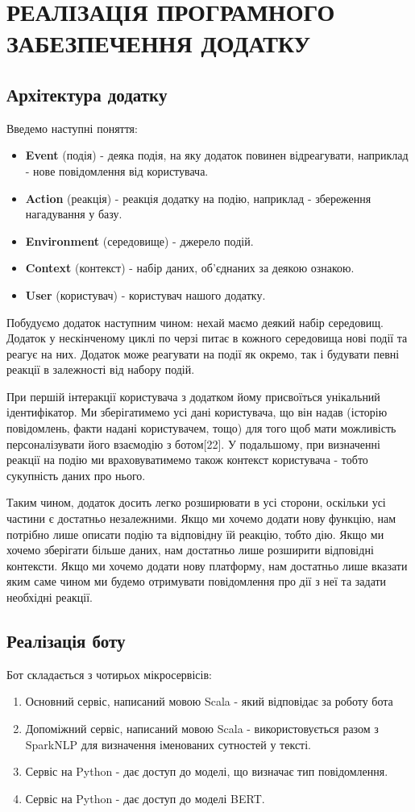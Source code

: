 \chapter{РЕАЛІЗАЦІЯ ПРОГРАМНОГО ЗАБЕЗПЕЧЕННЯ ДОДАТКУ}

\section{Архітектура додатку}
Введемо наступні поняття:

\begin{itemize}
\item \textbf{Event} (подія) - деяка подія, на яку додаток повинен відреагувати, наприклад - нове повідомлення від користувача.
\item \textbf{Action} (реакція) - реакція додатку на подію, наприклад - збереження нагадування у базу.
\item \textbf{Environment} (середовище) - джерело подій.
\item \textbf{Context} (контекст) - набір даних, об'єднаних за деякою ознакою.
\item \textbf{User} (користувач) - користувач нашого додатку.
\end{itemize}

Побудуємо додаток наступним чином: нехай маємо деякий набір середовищ. Додаток у нескінченому циклі по черзі питає в кожного середовища нові події та реагує на них. Додаток може реагувати на події як окремо, так і будувати певні реакції в залежності від набору подій. 


При першій інтеракції користувача з додатком йому присвоїться унікальний ідентифікатор. Ми зберігатимемо усі дані користувача, що він надав (історію повідомлень, факти надані користувачем, тощо) для того щоб мати можливість персоналізувати його взаємодію з ботом[22]. У подальшому, при визначенні реакції на подію ми враховуватимемо також контекст користувача - тобто сукупність даних про нього.


Таким чином, додаток досить легко розширювати в усі сторони, оскільки усі частини є достатньо незалежними. Якщо ми хочемо додати нову функцію, нам потрібно лише описати подію та відповідну їй реакцію, тобто дію. Якщо ми хочемо зберігати більше даних, нам достатньо лише розширити відповідні контексти. Якщо ми хочемо додати нову платформу, нам достатньо лише вказати яким саме чином ми будемо отримувати повідомлення про дії з неї та задати необхідні реакції. 
\section{Реалізація боту}
Бот складається з чотирьох мікросервісів:
\begin{enumerate}
\item Основний сервіс, написаний мовою Scala - який відповідає за роботу бота
\item Допоміжний сервіс, написаний мовою Scala - використовується разом з SparkNLP для визначення іменованих сутностей у тексті.
\item Сервіс на Python - дає доступ до моделі, що визначає тип повідомлення.
\item Сервіс на Python  - дає доступ до моделі BERT.
\end{enumerate}

